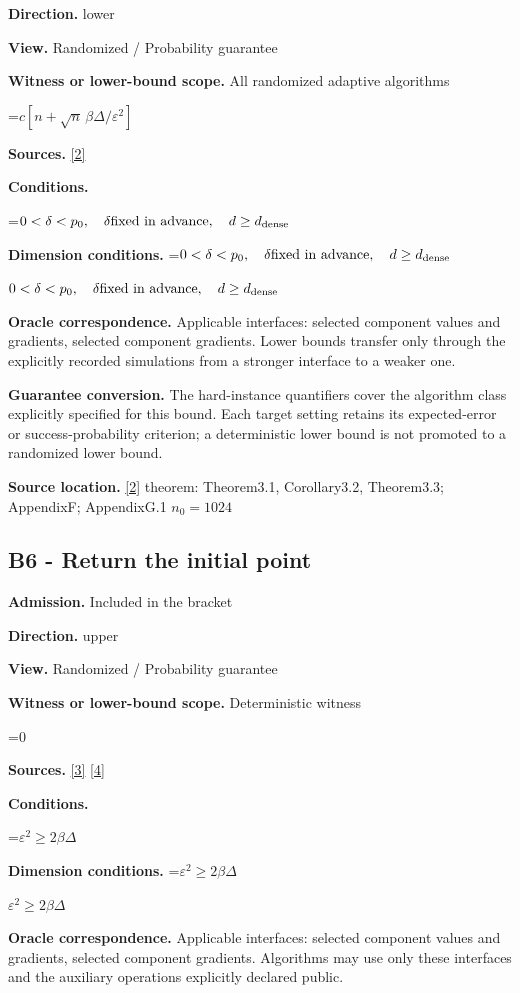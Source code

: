 \documentclass[10pt,a4paper]{article}
\newcommand{\AtlasMath}[1]{\par\begingroup\centering\setbox0=\hbox{$\displaystyle #1$}\ifdim\wd0>1.4\linewidth\typeout{ATLAS WIDE FORMULA: \the\wd0}\fi\ifdim\wd0>\linewidth\resizebox{\linewidth}{!}{\box0}\else\box0\fi\par\endgroup}
\newcommand{\AtlasInlineMath}[1]{\begingroup\setbox0=\hbox{$#1$}\ifdim\wd0>.4\linewidth\endgroup\AtlasMath{#1}\else\endgroup$#1$\fi}
\begin{document}
\textbf{Direction.} lower

\textbf{View.} Randomized / Probability guarantee

\textbf{Witness or lower-bound scope.} All randomized adaptive algorithms

\AtlasMath{c[n+\sqrt n\,\beta\Delta/\varepsilon^2]}
\textbf{Sources.} \href{https://arxiv.org/pdf/2609.00045v3}{[2]}

\textbf{Conditions.} 
\AtlasMath{0<\delta<p_0,\quad\delta\text{fixed in advance},\quad d\ge d_{\rm dense}}


\textbf{Dimension conditions.} \AtlasInlineMath{0<\delta<p_0,\quad\delta\text{fixed in advance},\quad d\ge d_{\rm dense}}

\textbf{Oracle correspondence.} Applicable interfaces: selected component values and gradients, selected component gradients. Lower bounds transfer only through the explicitly recorded simulations from a stronger interface to a weaker one.

\textbf{Guarantee conversion.} The hard-instance quantifiers cover the algorithm class explicitly specified for this bound. Each target setting retains its expected-error or success-probability criterion; a deterministic lower bound is not promoted to a randomized lower bound.

\textbf{Source location.} \href{https://arxiv.org/pdf/2609.00045v3}{[2]} theorem: Theorem3.1, Corollary3.2, Theorem3.3; AppendixF; AppendixG.1 $n_0=1024$

\subsection{B6 - Return the initial point}
\textbf{Admission.} Included in the bracket

\textbf{Direction.} upper

\textbf{View.} Randomized / Probability guarantee

\textbf{Witness or lower-bound scope.} Deterministic witness

\AtlasMath{0}
\textbf{Sources.} \href{https://proceedings.mlr.press/v97/zhou19b/zhou19b.pdf}{[3]} \href{https://arxiv.org/pdf/1405.4980}{[4]}

\textbf{Conditions.} 
\AtlasMath{\varepsilon^2\ge2\beta\Delta}


\textbf{Dimension conditions.} \AtlasInlineMath{\varepsilon^2\ge2\beta\Delta}

\textbf{Oracle correspondence.} Applicable interfaces: selected component values and gradients, selected component gradients. Algorithms may use only these interfaces and the auxiliary operations explicitly declared public.
\end{document}
